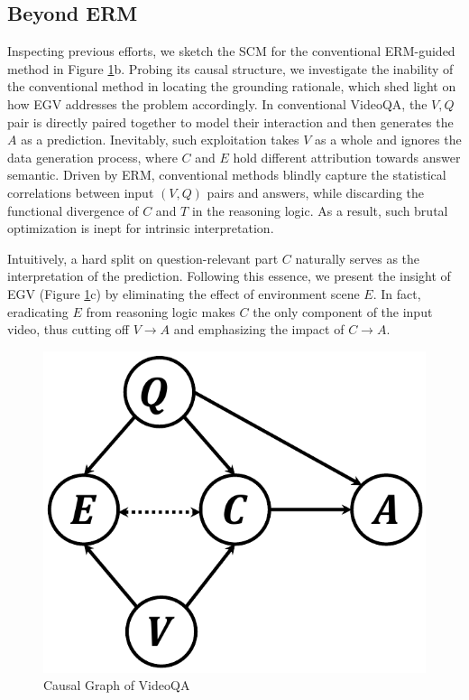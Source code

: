 \subsection{Beyond ERM}

Inspecting previous efforts, we sketch the SCM for the conventional ERM-guided method in Figure \ref{fig:scm}b.  Probing its causal structure, we investigate the inability of the conventional method in locating the grounding rationale, which shed light on how EGV addresses the problem accordingly.
%
In conventional VideoQA, the $V, Q$ pair is directly paired together to model their interaction and then generates the $A$ as a prediction. Inevitably, such exploitation takes $V$ as a whole and ignores the data generation process, where $C$ and $E$ hold different attribution towards answer semantic. 
%
Driven by ERM, conventional methods blindly capture the statistical correlations between input $(V, Q)$ pairs and answers, while discarding the functional divergence of $C$ and $T$ in the reasoning logic. As a result, such brutal optimization is inept for intrinsic interpretation.

    
%
Intuitively, a hard split on question-relevant part $C$ naturally serves as the interpretation of the prediction. Following this essence, we present the insight of EGV (Figure \ref{fig:scm}c) by eliminating the effect of environment scene $E$. 
%
In fact, eradicating $E$ from reasoning logic makes $C$ the only component of the input video, thus cutting off  $V \to A$ and emphasizing the impact of $C \to A$.







\begin{figure}[t]
\centering
\includegraphics[scale=0.28]{fig/scm.pdf}
\caption{Causal Graph of VideoQA}
\vspace{-5pt}
\label{fig:scm}
\end{figure}
